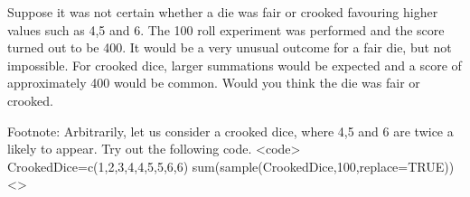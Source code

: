 Suppose it was not certain whether a die was fair or crooked favouring higher values such as 4,5 and 6. 
The 100 roll experiment was performed and the score turned out to be 400.  
It would be a very unusual outcome for a fair die, but not impossible. 
For crooked dice, larger summations would be expected and a score of approximately 400 would be common. Would you think the die was fair or crooked.

Footnote: Arbitrarily, let us consider a crooked dice, where 4,5 and 6 are twice a likely to appear. Try out the following code.
<code>
CrookedDice=c(1,2,3,4,4,5,5,6,6)
sum(sample(CrookedDice,100,replace=TRUE))
<\code>
